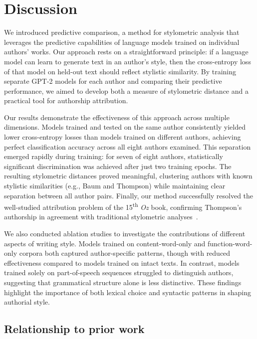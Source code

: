 \documentclass[11pt]{article}
\providecommand{\DIFaddend}{} %
\DeclareRobustCommand{\DIFaddend}{\DIFOaddend \let\includegraphics\DIFOincludegraphics} %
\begin{document}
\DIFaddend \section{Discussion}

We introduced predictive comparison, a method for stylometric analysis that
leverages the predictive capabilities of language models trained on individual
authors' works. Our approach rests on a straightforward principle: if a
language model can learn to generate text in an author's style, then the
cross-entropy loss of that model on held-out text should reflect stylistic
similarity. By training separate GPT-2 models for each author and comparing
their predictive performance, we aimed to develop both a measure of stylometric
distance and a practical tool for authorship attribution.

Our results demonstrate the effectiveness of this approach across multiple
dimensions. Models trained and tested on the same author consistently yielded
lower cross-entropy losses than models trained on different authors, achieving
perfect classification accuracy across all eight authors examined. This
separation emerged rapidly during training: for seven of eight authors,
statistically significant discrimination was achieved after just two training
epochs. The resulting stylometric distances proved meaningful, clustering
authors with known stylistic similarities (e.g., Baum and Thompson) while
maintaining clear separation between all author pairs. Finally, our method
successfully resolved the well-studied attribution problem of the
15\textsuperscript{th} \emph{Oz} book, confirming Thompson's authorship in
agreement with traditional stylometric analyses~\citep{NiloBino03}.

We also conducted ablation studies to investigate the contributions of different
aspects of writing style. Models trained on content-word-only and function-word-only
corpora both captured author-specific patterns, though with reduced effectiveness
compared to models trained on intact texts. In contrast, models trained solely on
part-of-speech sequences struggled to distinguish authors, suggesting that
grammatical structure alone is less distinctive. These findings highlight the
importance of both lexical choice and syntactic patterns in shaping authorial style.

\subsection{Relationship to prior work}
\end{document}

